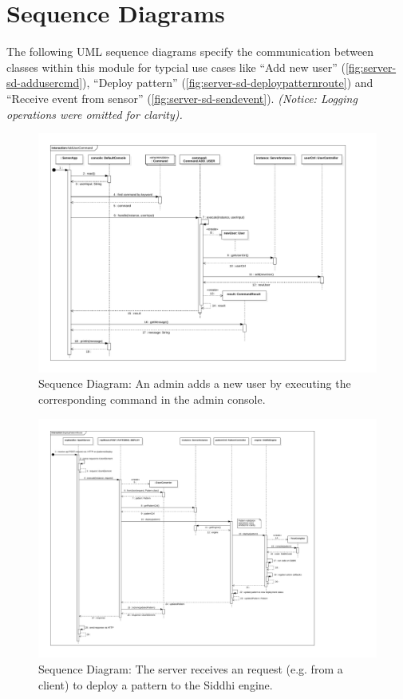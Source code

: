 \section{Sequence Diagrams}
The following UML sequence diagrams specify the communication between classes
within this module for typcial use cases like
\enquote{Add new user} (\autoref{fig:server-sd-addusercmd}),
\enquote{Deploy pattern} (\autoref{fig:server-sd-deploypatternroute}) and
\enquote{Receive event from sensor} (\autoref{fig:server-sd-sendevent}).
\emph{(Notice: Logging operations were omitted for clarity).}

\FloatBarrier
\begin{figure}[h]
    \centering
    \includegraphics[width=\textwidth]{../module_res/server-sd-addusercmd.pdf}
    \caption{Sequence Diagram:
        An admin adds a new user by executing the corresponding command in the
        admin console.
    \label{fig:server-sd-addusercmd}}
\end{figure}

\begin{figure}[h]
    \centering
    \includegraphics[width=\textwidth]{../module_res/server-sd-deploypatternroute.pdf}
    \caption{Sequence Diagram:
        The server receives an request (e.g. from a client) to deploy a pattern
        to the Siddhi engine.
    \label{fig:server-sd-deploypatternroute}}
\end{figure}

